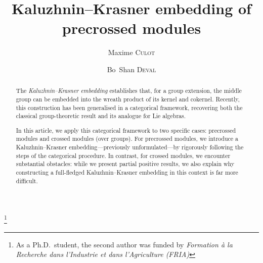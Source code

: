 \documentclass[a4paper, british, reqno]{amsart}
\newcommand*{\surname}[1]{\textsc{#1}}
\theoremstyle{definition}
\theoremstyle{remark}
\begin{document}
\title{Kaluzhnin--Krasner embedding of precrossed modules}

\author{Maxime \surname{Culot}}
\author{Bo~Shan \surname{Deval}}


\address[Maxime \surname{Culot}, Bo~Shan \surname{Deval}]{\foreignlanguage{french}{Institut de Recherche en Mathématique et Physique, Université catholique de Louvain, Chemin du Cyclotron~2 bte~L7.01.02, B--1348 Louvain-la-Neuve}, Belgium}    %

\thanks{As a Ph.D.\ student, the second author was funded by \emph{Formation à la Recherche dans l'Industrie et dans l'Agriculture (FRIA)}}

\begin{abstract}
	The \emph{Kaluzhnin--Krasner embedding} establishes that, for a group extension, the middle group can be embedded into the wreath product of its kernel and cokernel. Recently, this construction has been generalised in a categorical framework, recovering both the classical group-theoretic result and its analogue for Lie algebras.

	In this article, we apply this categorical framework to two specific cases: precrossed modules and crossed modules (over groups). For precrossed modules, we introduce a Kaluzhnin--Krasner embedding---previously unformulated---by rigorously following the steps of the categorical procedure. In contrast, for crossed modules, we encounter substantial obstacles: while we present partial positive results, we also explain why constructing a full-fledged Kaluzhnin--Krasner embedding in this context is far more difficult.
\end{abstract}


\maketitle

\tableofcontents
\end{document}
